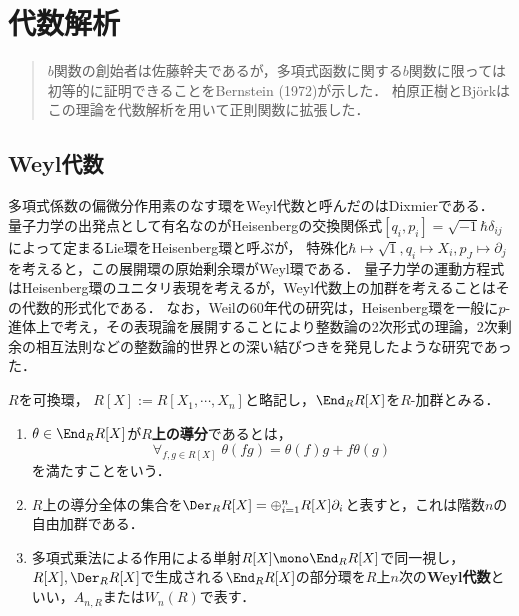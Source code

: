 \documentclass[uplatex,dvipdfmx]{jsreport}
\begin{document}
\chapter{代数解析}

\begin{quotation}
    $b$関数の創始者は佐藤幹夫であるが，多項式函数に関する$b$関数に限っては初等的に証明できることをBernstein (1972)が示した．
    柏原正樹とBjörkはこの理論を代数解析を用いて正則関数に拡張した\cite{堀田}．
\end{quotation}

\section{Weyl代数}

\begin{history}
    多項式係数の偏微分作用素のなす環をWeyl代数と呼んだのはDixmierである．
    量子力学の出発点として有名なのがHeisenbergの交換関係式$[q_i,p_i]=\sqrt{-1}\hbar\delta_{ij}$によって定まるLie環をHeisenberg環と呼ぶが，
    特殊化$\hbar\mapsto\sqrt{1},q_i\mapsto X_i,p_J\mapsto\partial_j$を考えると，この展開環の原始剰余環がWeyl環である．
    量子力学の運動方程式はHeisenberg環のユニタリ表現を考えるが，Weyl代数上の加群を考えることはその代数的形式化である．
    なお，Weilの60年代の研究は，Heisenberg環を一般に$p$-進体上で考え，その表現論を展開することにより整数論の2次形式の理論，2次剰余の相互法則などの整数論的世界との深い結びつきを発見したような研究であった．
\end{history}

\begin{notation}
    $R$を可換環，
    $R[X]:=R[X_1,\cdots,X_n]$と略記し，$\End_RR[X]$を$R$-加群とみる．
\end{notation}

\begin{definition}\mbox{}
    \begin{enumerate}
        \item $\theta\in\End_RR[X]$が\textbf{$R$上の導分}であるとは，
        \[\forall_{f,g\in R[X]}\;\theta(fg)=\theta(f)g+f\theta(g)\]
        を満たすことをいう．
        \item $R$上の導分全体の集合を$\Der_RR[X]=\oplus_{i=1}^nR[X]\partial_i$と表すと，これは階数$n$の自由加群である．
        \item 多項式乗法による作用による単射$R[X]\mono\End_RR[X]$で同一視し，$R[X],\Der_RR[X]$で生成される$\End_RR[X]$の部分環を$R$上$n$次の\textbf{Weyl代数}といい，$A_{n,R}$または$W_n(R)$で表す．
    \end{enumerate}
\end{definition}
\end{document}
